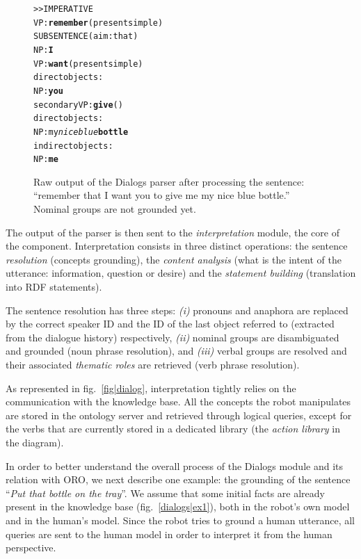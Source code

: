 \documentclass{svmult}
\begin{document}
\begin{figure}%
\begin{center}
\scriptsize
\begin{alltt}
>> IMPERATIVE
VP: \textbf{remember} (present simple)
    SUBSENTENCE (aim: that)
      NP: \textbf{I}
      VP: \textbf{want} (present simple)
        direct objects: 
          NP: \textbf{you}
        secondary VP: \textbf{give} ()
              direct objects:
                NP: my \emph{nice blue} \textbf{bottle}
              indirect objects:
                NP: \textbf{me}
\end{alltt}
\end{center}
\caption{Raw output of the {\sc Dialogs} parser after processing the
sentence: ``remember that I want you to give me my nice blue bottle.'' 
Nominal groups are not grounded yet.} 
\label{dialog|parser_output}
\end{figure}

The output of the parser is then sent to the \emph{interpretation} module, the
core of the component.  Interpretation consists in three distinct operations:
the sentence \emph{resolution} (concepts grounding), the \emph{content
analysis} (what is the intent of the utterance: information, question or
desire) and the \emph{statement building} (translation into RDF statements).

The sentence resolution has three steps: {\it(i)} pronouns and anaphora are
replaced by the correct speaker ID and the ID of the last object referred to
(extracted from the dialogue history) respectively, {\it(ii)} nominal groups are
disambiguated and grounded (noun phrase resolution), and {\it(iii)}
verbal groups are resolved and their associated \emph{thematic roles} are
retrieved (verb phrase resolution).

As represented in fig.~\ref{fig|dialog}, interpretation tightly relies on the
communication with the knowledge base. All the concepts the robot manipulates
are stored in the ontology server and retrieved through logical
queries, except for the verbs that are currently stored in a dedicated library
(the \emph{action library} in the diagram).

In order to better understand the overall process of the {\sc Dialogs} module 
and its relation with ORO, we next describe one example: the grounding of the
sentence ``\emph{Put that bottle on the tray}''. We assume that some initial
facts are already present in the knowledge base (fig.~\ref{dialogs|ex1}), both in the
robot's own model and in the human's model.  Since the robot tries to ground a
human utterance, all queries are sent to the human model in order to interpret
it from the human perspective. 
\end{document}
